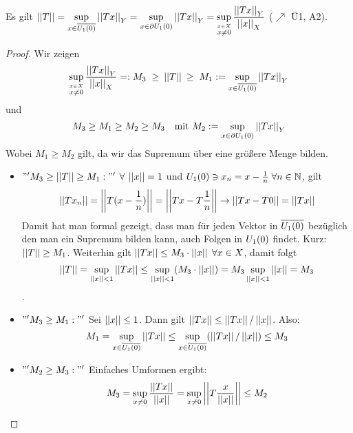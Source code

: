 \documentclass[ngerman]{report}
\begin{document}
	\begin{bem}
		Es gilt 
		$\disp \norm{T} = \supT[A]\norm{Tx}_Y = \supT[R] \norm{Tx}_Y
		= \sup_{\overset{x \in X}{x \not = 0}} \frac{\norm{Tx}_Y}{\norm{x}_X}$
		($\nearrow$ Ü1, A2).

		\begin{proof}
			Wir zeigen  
				$$\sup_{\overset{x \in X}{x \not = 0}} \frac{\norm{Tx}_Y}{\norm{x}_X} =:M_3 \; \geq \: \norm{T} \: \geq \; M_1 := \supT[A]\norm{Tx}_Y $$ 
				und 
				$$ M_3 \geq M_1\geq M_2 \geq M_3 \quad \text{mit } M_2 := \supT[R] \norm{Tx}_Y$$ 
			Wobei $M_1 \geq M_2$ gilt, da wir das Supremum über eine größere Menge bilden.
			\begin{itemize}[  ]

				\item $"' M_3 \geq \norm{T} \geq M_1: "'$ $\forall \: \norm{x} = 1$ und $\EK \ni x_n = x - \frac{1}{n} \; \forall n\in\N$, gilt 
				$$\norm{Tx_n} = \norm{T(x-\frac{1}{n})} = \norm{Tx - T\frac{1}{n}} \to \norm{Tx - T0} = \norm{Tx}$$ 
				Damit hat man formal gezeigt, dass man für jeden Vektor in $\ov{\EK}$ bezüglich den man ein Supremum bilden kann, auch Folgen in $\EK$ findet. Kurz: $\norm{T} \geq M_1$.
				Weiterhin gilt $\norm{Tx} \leq M_3 \cdot \norm{x} \; \forall x\in X $, damit folgt 
					$$ \norm{T} = \sup_{\norm{x} < 1} \norm{Tx} \leq \sup_{\norm{x} < 1} (M_3 \cdot \norm{x}) = M_3 \sup_{\norm{x} < 1} \norm{x} = M_3$$.

				\item $\disp "' M_3 \geq  M_1: "'$ Sei $\norm{x} \leq 1$. Dann gilt $\norm{Tx} \leq \norm{Tx}/\norm{x}$. Also:
					$$ M_1 =  \supT[A]\norm{Tx} \leq \supT[A] (\norm{Tx}/ \norm{x}) \leq  M_3$$

				\item $\disp "' M_2 \geq  M_3: "'$ Einfaches Umformen ergibt:
					$$ M_3 = \sup_{{x \not = 0}} \frac{\norm{Tx}}{\norm{x}} = \sup_{{x \not = 0}} \norm{T\frac{x}{\norm{x}}} \leq M_2$$ 	
				
			\end{itemize}
		\end{proof}
	\end{bem}
\end{document}
